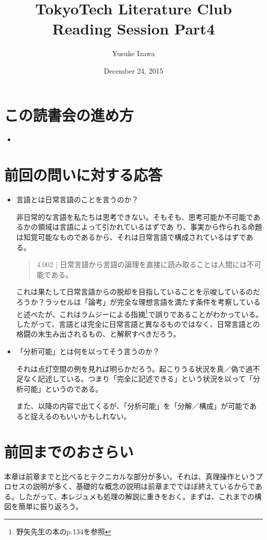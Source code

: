 \documentclass[12pt,a4paper,onecolumn,openany,article]{jsarticle}
\title{TokyoTech Literature Club Reading Session Part4}
\author{Yusuke Izawa}
\date{December 24, 2015}
\begin{document}
\maketitle

\section{この読書会の進め方}
\begin{itemize}
  \item 
\end{itemize}

\section{前回の問いに対する応答}
\begin{itemize}
  \item 言語とは日常言語のことを言うのか？
  
  非日常的な言語を私たちは思考できない。そもそも、思考可能か不可能であるかの領域は言語によって引かれているはずであ り、事実から作られる命題は知覚可能なものであるから、それは日常言語で構成されているはずである。
  \begin{quote}
     4.002 | 日常言語から言語の論理を直接に読み取ることは人間には不可能である。
  \end{quote}  
   
  これは果たして日常言語からの脱却を目指していることを示唆しているのだろうか？ラッセルは「論考」が完全な理想言語を満たす条件を考察していると述べたが、これはラムジーによる指摘\footnote{野矢先生の本のp.134を参照}で誤りであることがわかっている。したがって、言語とは完全に日常言語と異なるものではなく、日常言語との格闘の末生み出されるもの、と解釈すべきだろう。
  
  \item 「分析可能」とは何を以ってそう言うのか？
  
  それは点灯空間の例を見れば明らかだろう。起こりうる状況を真／偽で過不足なく記述している。つまり「完全に記述できる」という状況を以って「分析可能」というのである。
  
  また、以降の内容で出てくるが、「分析可能」を「分解／構成」が可能であると捉えるのもいいかもしれない。
  
\end{itemize}

\section{前回までのおさらい}
本章は前章までと比べるとテクニカルな部分が多い。それは、真理操作というプロセスの説明が多く、基礎的な概念の説明は前章まででほぼ終えているからである。したがって、本レジュメも処理の解説に重きをおく。まずは、これまでの構図を簡単に振り返ろう。
\end{document}
